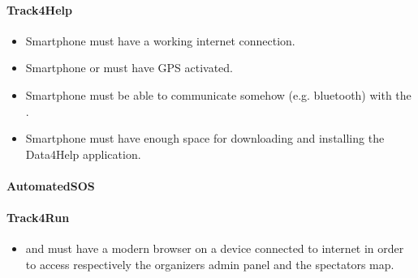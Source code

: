 \documentclass[../../rasd.tex]{subfiles}
\begin{document}
			\paragraph{Track4Help}
			 	\begin{itemize}	
			 		\item Smartphone must have a working internet connection.
			 		\item Smartphone or  must have GPS activated.
			 		\item Smartphone must be able to communicate somehow (e.g. bluetooth) with the .
			 		\item Smartphone must have enough space for downloading and installing the Data4Help application.
			 	\end{itemize}
			 \paragraph{AutomatedSOS}
			 \paragraph{Track4Run}
			 	\begin{itemize}
			 		\item {} and  must have a modern browser on a device connected to internet in order to access respectively the organizers admin panel and the spectators map.
			 	\end{itemize}
\end{document}
